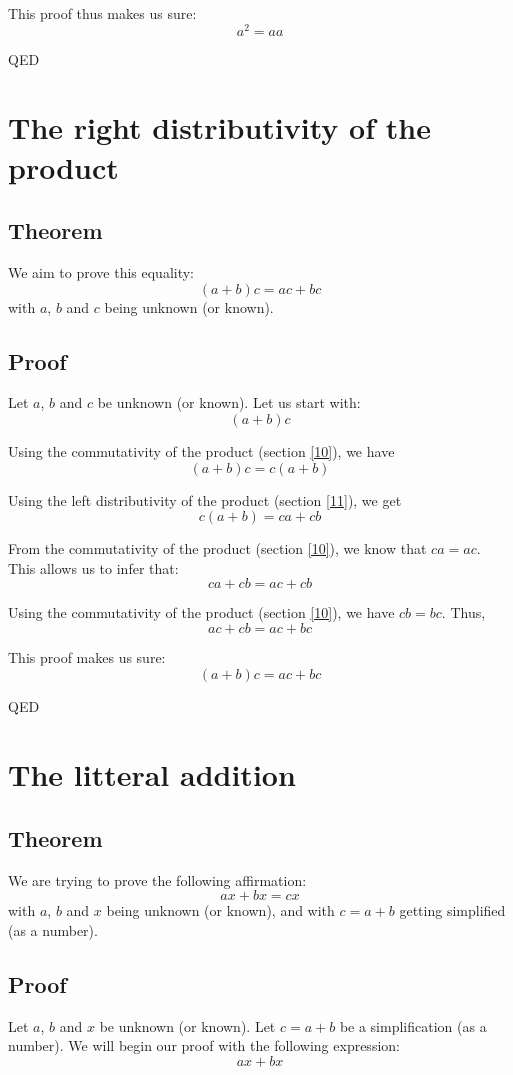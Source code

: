 \documentclass[a4paper]{article}
\begin{document}
This proof thus makes us sure:
\[a^2 = aa\]
\begin{flushright}
QED
\end{flushright}



\section{The right distributivity of the product\label{9}}
\subsection{Theorem}
We aim to prove this equality:
\[\left(a + b\right)c = ac + bc\]
with $a$, $b$ and $c$ being unknown (or known).\subsection{Proof}
Let $a$, $b$ and $c$ be unknown (or known). Let us start with:
\[\left(a+b\right)c\]

Using the commutativity of the product (section \ref{10}), we have
\[\left(a+b\right)c=c\left(a+b\right)\]

Using the left distributivity of the product (section \ref{11}), we get
\[c\left(a+b\right)=ca+cb\]

From the commutativity of the product (section \ref{10}), we know that $ca=ac$. This allows us to infer that:
\[ca+cb=ac+cb\]

Using the commutativity of the product (section \ref{10}), we have $cb=bc$. Thus,
\[ac+cb=ac+bc\]

This proof makes us sure:
\[\left(a+b\right)c = ac+bc\]
\begin{flushright}
QED
\end{flushright}



\section{The litteral addition\label{13}}
\subsection{Theorem}
We are trying to prove the following affirmation:
\[ax + bx = cx\]
with $a$, $b$ and $x$ being unknown (or known), and with $c=a+b$ getting simplified (as a number).\subsection{Proof}
Let $a$, $b$ and $x$ be unknown (or known). Let $c=a+b$ be a simplification (as a number). We will begin our proof with the following expression:
\[ax+bx\]
\end{document}
